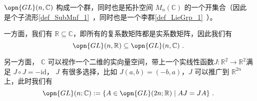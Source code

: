 $\opn{GL}(n, \mathbb{C})$ 构成一个群，同时也是拓扑空间 $M_n(\mathbb{C})$ 的一个开集合（因此是个子流形\autoref{def_SubMnf_1}~，同时也是一个李群\autoref{def_LieGrp_1}~）。

一方面，我们有 $\mathbb{R} \subseteq \mathbb{C}$，即所有的复系数矩阵都是实系数矩阵，因此我们有
$$
\opn{GL}(n, \mathbb{R}) \subseteq \opn{GL}(n, \mathbb{C})~.
$$

另一方面， $\mathbb{C}$ 可以视作一个二维的实向量空间，带上一个实线性函数$J: \mathbb{R}^2 \to \mathbb{R}^2$满足 $J \circ J = -\text{id}$， $J$ 有很多选择，比如 $J(a, b) = (-b, a)$，$J$ 可以推广到 $\mathbb{R}^{2 n}$ 上，此时我们有
$$
\opn{GL}(n; \mathbb{C}): = \{A \in \opn{GL}(2 n; \mathbb{R}) \mid A J = J A \}~.
$$






